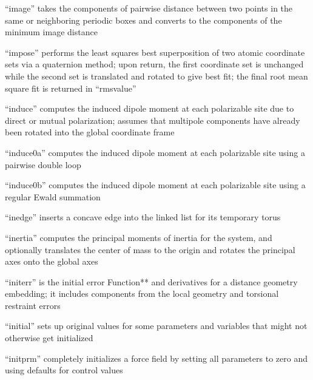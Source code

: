 \documentclass[letterpaper,11pt,english]{sphinxmanual}
\begin{document}

“image” takes the components of pairwise distance between two points in the same or neighboring periodic boxes and converts to the components of the minimum image distance


“impose” performs the least squares best superposition of two atomic coordinate sets via a quaternion method; upon return, the first coordinate set is unchanged while the second set is translated and rotated to give best fit; the final root mean square fit is returned in “rmsvalue”


“induce” computes the induced dipole moment at each polarizable site due to direct or mutual polarization; assumes that multipole components have already been rotated into the global coordinate frame


“induce0a” computes the induced dipole moment at each polarizable site using a pairwise double loop


“induce0b” computes the induced dipole moment at each polarizable site using a regular Ewald summation


“inedge” inserts a concave edge into the linked list for its temporary torus


“inertia” computes the principal moments of inertia for the system, and optionally translates the center of mass to the origin and rotates the principal axes onto the global axes


“initerr” is the initial error Function** and derivatives for a distance geometry embedding; it includes components from the local geometry and torsional restraint errors


“initial” sets up original values for some parameters and variables that might not otherwise get initialized


“initprm” completely initializes a force field by setting all parameters to zero and using defaults for control values
\end{document}

